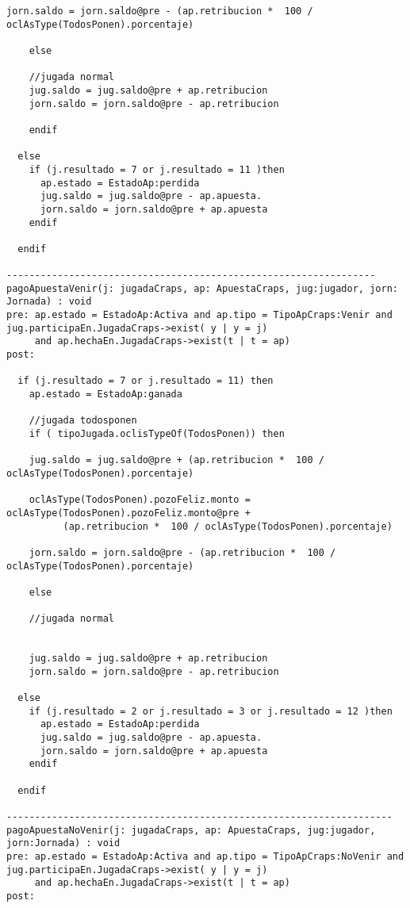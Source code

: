 \begin{framed}
\begin{lstlisting}[breaklines=true]
    jorn.saldo = jorn.saldo@pre - (ap.retribucion *  100 / oclAsType(TodosPonen).porcentaje)

    else

    //jugada normal
    jug.saldo = jug.saldo@pre + ap.retribucion
    jorn.saldo = jorn.saldo@pre - ap.retribucion

    endif

  else 
    if (j.resultado = 7 or j.resultado = 11 )then
      ap.estado = EstadoAp:perdida
      jug.saldo = jug.saldo@pre - ap.apuesta.
      jorn.saldo = jorn.saldo@pre + ap.apuesta
    endif
  
  endif

-----------------------------------------------------------------
pagoApuestaVenir(j: jugadaCraps, ap: ApuestaCraps, jug:jugador, jorn: Jornada) : void
pre: ap.estado = EstadoAp:Activa and ap.tipo = TipoApCraps:Venir and jug.participaEn.JugadaCraps->exist( y | y = j) 
     and ap.hechaEn.JugadaCraps->exist(t | t = ap)
post:

  if (j.resultado = 7 or j.resultado = 11) then
    ap.estado = EstadoAp:ganada

    //jugada todosponen
    if ( tipoJugada.oclisTypeOf(TodosPonen)) then 
    
    jug.saldo = jug.saldo@pre + (ap.retribucion *  100 / oclAsType(TodosPonen).porcentaje)
    
    oclAsType(TodosPonen).pozoFeliz.monto = oclAsType(TodosPonen).pozoFeliz.monto@pre + 
          (ap.retribucion *  100 / oclAsType(TodosPonen).porcentaje)

    jorn.saldo = jorn.saldo@pre - (ap.retribucion *  100 / oclAsType(TodosPonen).porcentaje)

    else

    //jugada normal


    jug.saldo = jug.saldo@pre + ap.retribucion
    jorn.saldo = jorn.saldo@pre - ap.retribucion

  else 
    if (j.resultado = 2 or j.resultado = 3 or j.resultado = 12 )then
      ap.estado = EstadoAp:perdida
      jug.saldo = jug.saldo@pre - ap.apuesta.
      jorn.saldo = jorn.saldo@pre + ap.apuesta
    endif
  
  endif

--------------------------------------------------------------------
pagoApuestaNoVenir(j: jugadaCraps, ap: ApuestaCraps, jug:jugador, jorn:Jornada) : void
pre: ap.estado = EstadoAp:Activa and ap.tipo = TipoApCraps:NoVenir and jug.participaEn.JugadaCraps->exist( y | y = j) 
     and ap.hechaEn.JugadaCraps->exist(t | t = ap)
post:


\end{lstlisting}
\end{framed}
